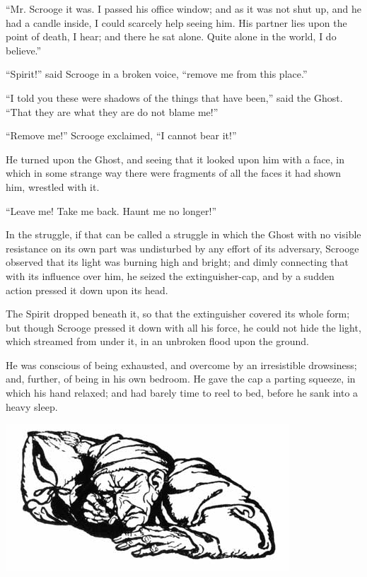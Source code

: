 \documentclass[paper=5.5in:8.5in,BCOR=15mm,twoside,DIV=15,headinclude=off,12pt,chapterprefix=off,openany,headings=huge]{scrbook} %
\begin{document}
\enquote{Mr. Scrooge it was. I passed his office window; and as it was not shut up, and he had a candle inside, I could scarcely help seeing him. His partner lies upon the point of death, I hear; and there he sat alone. Quite alone in the world, I do believe.}

\enquote{Spirit!} said Scrooge in a broken voice, \enquote{remove me from this place.}

\enquote{I told you these were shadows of the things that have been,} said the Ghost. \enquote{That they are what they are do not blame me!}

\enquote{Remove me!} Scrooge exclaimed, \enquote{I cannot bear it!}

He turned upon the Ghost, and seeing that it looked upon him with a face, in which in some strange way there were fragments of all the faces it had shown him, wrestled with it.

\enquote{Leave me! Take me back. Haunt me no longer!}

In the struggle, if that can be called a struggle in which the Ghost with no visible resistance on its own part was undisturbed by any effort of its adversary, Scrooge observed that its light was burning high and bright; and dimly connecting that with its influence over him, he seized the extinguisher-cap, and by a sudden action pressed it down upon its head.



The Spirit dropped beneath it, so that the extinguisher covered its whole form; but though Scrooge pressed it down with all his force, he could not hide the light, which streamed from under it, in an unbroken flood upon the ground.

He was conscious of being exhausted, and overcome by an irresistible drowsiness; and, further, of being in his own bedroom. He gave the cap a parting squeeze, in which his hand relaxed; and had barely time to reel to bed, before he sank into a heavy sleep.

\begin{minipage}[c]{\linewidth}
\includegraphics[width=\linewidth]{gs090}
\end{minipage}
\end{document}
